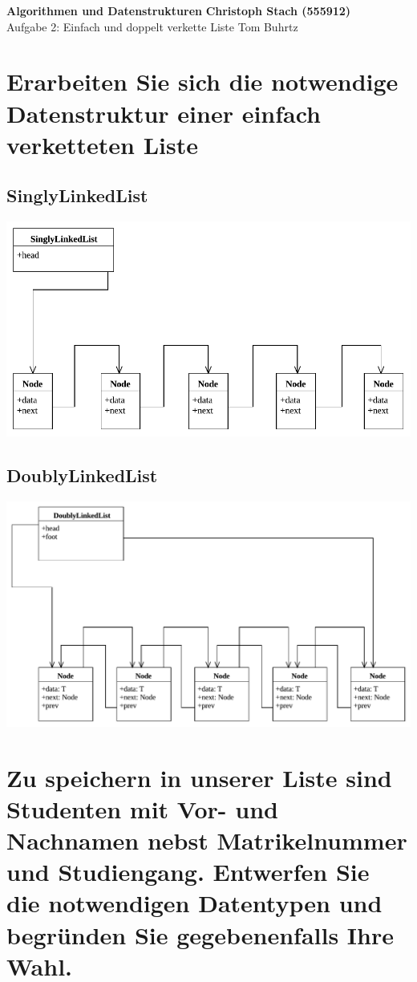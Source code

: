 \documentclass[a4paper, 11pt]{article}
\begin{document}
\noindent
\large\textbf{Algorithmen und Datenstrukturen} \hfill \textbf{Christoph Stach (555912)} \\
\normalsize Aufgabe 2: Einfach und doppelt verkette Liste \hfill Tom Buhrtz \\

\section*{Erarbeiten Sie sich die notwendige Datenstruktur einer einfach verketteten Liste}


\subsection*{SinglyLinkedList}
\includegraphics[width=\linewidth]{img/pdf/SinglyLinkedList}
\subsection*{DoublyLinkedList}
\includegraphics[width=\linewidth]{img/pdf/DoublyLinkedList}


\section*{Zu speichern in unserer Liste sind Studenten mit Vor- und Nachnamen nebst Matrikelnummer und Studiengang.
          Entwerfen Sie die notwendigen Datentypen und begründen Sie gegebenenfalls Ihre Wahl.}
\end{document}
